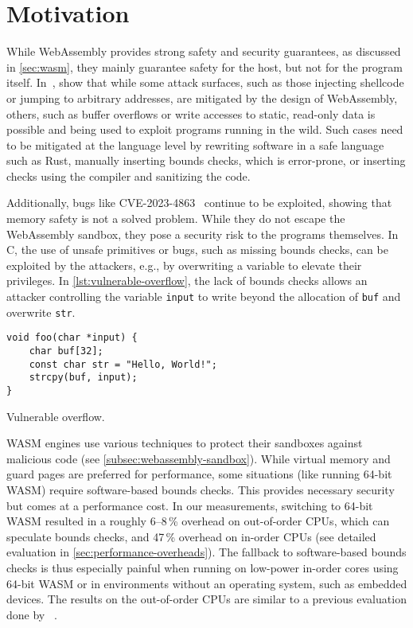 \chapter{Motivation}
\label{ch:motivation}

While WebAssembly provides strong safety and security guarantees, as discussed in \cref{sec:wasm}, they mainly guarantee safety for the host, but not for the program itself.
In~\cite{lehmann2020everything}, \citeauthor*{lehmann2020everything} show that while some attack surfaces, such as those injecting shellcode or jumping to arbitrary addresses, are mitigated by the design of WebAssembly, others, such as buffer overflows or write accesses to static, read-only data is possible and being used to exploit programs running in the wild.
Such cases need to be mitigated at the language level by rewriting software in a safe language such as Rust, manually inserting bounds checks, which is error-prone, or inserting checks using the compiler and sanitizing the code.

Additionally, bugs like {CVE-2023-4863}~\cite{CVE-2023-4863} continue to be exploited, showing that memory safety is not a solved problem.
While they do not escape the WebAssembly sandbox, they pose a security risk to the programs themselves.
In C, the use of unsafe primitives or bugs, such as missing bounds checks, can be exploited by the attackers, e.g., by overwriting a variable to elevate their privileges.
In \cref{lst:vulnerable-overflow}, the lack of bounds checks allows an attacker controlling the variable \texttt{input} to write beyond the allocation of \texttt{buf} and overwrite \texttt{str}.

\begin{lstfloat}[h]
    \centering
    \begin{lstlisting}[frame=h,style=customc,label={lst:vulnerable-overflow-inner}]
void foo(char *input) {
    char buf[32];
    const char str = "Hello, World!";
    strcpy(buf, input);
}
    \end{lstlisting}
    \caption{Vulnerable overflow.}
    \label{lst:vulnerable-overflow}
\end{lstfloat}

\Ac{WASM} engines use various techniques to protect their sandboxes against malicious code (see \cref{subsec:webassembly-sandbox}).
While virtual memory and guard pages are preferred for performance, some situations (like running 64-bit \ac{WASM}) require software-based bounds checks.
This provides necessary security but comes at a performance cost.
In our measurements, switching to 64-bit \ac{WASM} resulted in a roughly 6--8\,\% overhead on out-of-order CPUs, which can speculate bounds checks, and 47\,\% overhead on in-order CPUs (see detailed evaluation in \cref{sec:performance-overheads}).
The fallback to software-based bounds checks is thus especially painful when running on low-power in-order cores using 64-bit \ac{WASM} or in environments without an operating system, such as embedded devices.
The results on the out-of-order CPUs are similar to a previous evaluation done by \citeauthor*{szewczyk2022leaps}~\cite{szewczyk2022leaps}.

